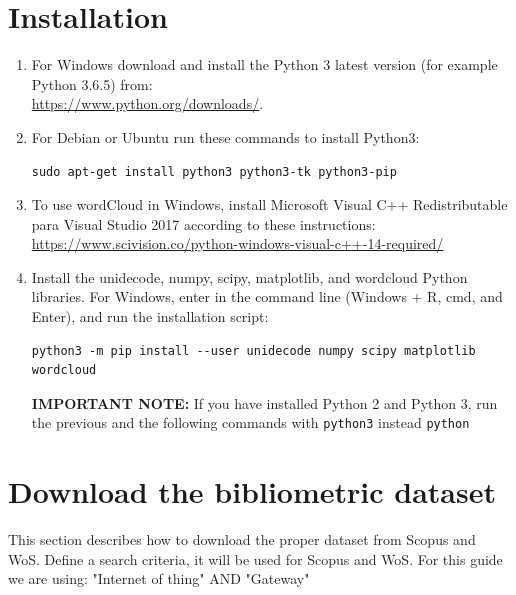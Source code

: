 \documentclass[10pt,letterpaper]{article}
\begin{document}
\tableofcontents

\newpage

\section{Installation}

\begin{enumerate}
\item For Windows download and install the Python 3 latest version (for example Python 3.6.5) from: \\ \url{https://www.python.org/downloads/}.
\item For Debian or Ubuntu run these commands to install Python3: 
\begin{verbatim}
sudo apt-get install python3 python3-tk python3-pip
\end{verbatim}

\item To use wordCloud in Windows, install Microsoft Visual C++ Redistributable para Visual Studio 2017 according to these instructions: \url{https://www.scivision.co/python-windows-visual-c++-14-required/}

\item Install the unidecode, numpy, scipy, matplotlib, and wordcloud Python libraries. For Windows, enter in the command line (Windows + R, cmd, and Enter), and run the installation script:
\begin{verbatim}
python3 -m pip install --user unidecode numpy scipy matplotlib wordcloud
\end{verbatim}

\textbf{IMPORTANT NOTE:} If you have installed Python 2 and Python 3, run the previous and the following commands with \verb|python3| instead \verb|python|
\end{enumerate}

\section{Download the bibliometric dataset}
This section describes how to download the proper dataset from Scopus and WoS. Define a search criteria, it will be used for Scopus and WoS. For this guide we are using: "Internet of thing"  AND  "Gateway" 
\end{document}
